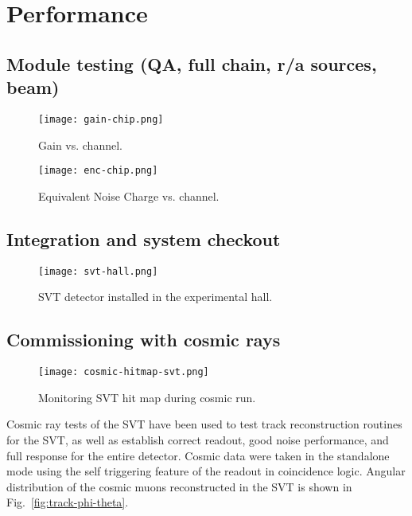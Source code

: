 \section{Performance}

\subsection{Module testing (QA, full chain, r/a sources, beam)}

\begin{figure}[hbt] 
\centering 
\texttt{[image: gain-chip.png]}
\caption{Gain vs. channel.}
\label{fig:gain-chip}
\end{figure}

\begin{figure}[hbt] 
\centering 
\texttt{[image: enc-chip.png]}
\caption{Equivalent Noise Charge vs. channel.}
\label{fig:enc-chip}
\end{figure}

\subsection{Integration and system checkout}

\begin{figure}[hbt] 
\centering 
\texttt{[image: svt-hall.png]}
\caption{SVT detector installed in the experimental hall.}
\label{fig:svt-hall}
\end{figure}

\subsection{Commissioning with cosmic rays}

\begin{figure}[hbt] 
\centering 
\texttt{[image: cosmic-hitmap-svt.png]}
\caption{Monitoring SVT hit map during cosmic run.}
\label{fig:cosmic-hitmap-svt}
\end{figure}

Cosmic ray tests of the SVT have been used to test track reconstruction routines for the SVT, as well as establish correct readout, good noise performance, and full response for the entire detector. Cosmic data were taken in the standalone mode using the self triggering feature of the readout in coincidence logic. Angular distribution of the cosmic muons reconstructed in the SVT is shown in Fig.~\ref{fig:track-phi-theta}.

